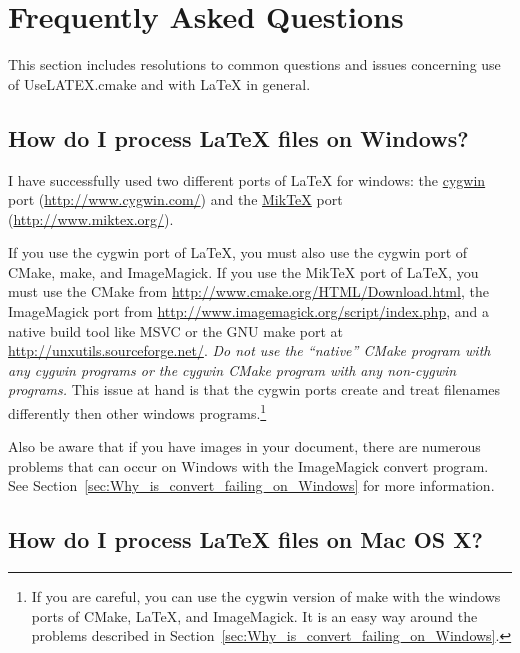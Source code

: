 \documentclass{article}
\newcommand*{\textfile}[1]{\textsf{#1}}
\newcommand*{\textprog}[1]{\textfile{#1}}
\newcommand*{\UseLATEX}{\textfile{UseLATEX.cmake}\xspace}
\newcommand*{\latex}{\LaTeX\xspace}
\newcommand*{\miktex}{Mik\TeX\xspace}
\begin{document}

  \section{Frequently Asked Questions}
  \label{sec:FrequentlyAskedQuestions}

  This section includes resolutions to common questions and issues
  concerning use of \UseLATEX and with \latex in general.

  \subsection{How do I process \latex files on Windows?}
  \label{sec:How_do_I_process_latex_files_on_Windows}

  I have successfully used two different ports of LaTeX for windows: the
  \href{http://www.cygwin.com/}{cygwin} port
  (\href{http://www.cygwin.com/}{http://www.cygwin.com/}) and the
  \href{http://www.miktex.org/}{\miktex} port
  (\href{http://www.miktex.org/}{http://www.miktex.org/}).

  If you use the cygwin port of \latex, you must also use the cygwin port
  of CMake, make, and ImageMagick. If you use the \miktex port of \latex,
  you must use the CMake from
  \href{http://www.cmake.org/HTML/Download.html}{http://www.cmake.org/HTML/Download.html},
  the ImageMagick port from
  \href{http://www.imagemagick.org/script/index.php}{http://www.imagemagick.org/script/index.php},
  and a native build tool like MSVC or the GNU make port at
  \href{http://unxutils.sourceforge.net/}{http://unxutils.sourceforge.net/}.
  \emph{Do not use the ``native'' CMake program with any cygwin programs or
  the cygwin CMake program with any non-cygwin programs.} This issue at
  hand is that the cygwin ports create and treat filenames differently then
  other windows programs.\footnote{If you are careful, you can use the
  cygwin version of make with the windows ports of CMake, \latex, and
  ImageMagick.  It is an easy way around the problems described in
  Section~\ref{sec:Why_is_convert_failing_on_Windows}.}

  Also be aware that if you have images in your document, there are
  numerous problems that can occur on Windows with the ImageMagick
  \textprog{convert} program. See
  Section~\ref{sec:Why_is_convert_failing_on_Windows} for more information.

  \subsection{How do I process \latex files on Mac OS X?}
  \label{sec:How_do_I_process_latex_files_on_Mac_OS_X}
\end{document}
